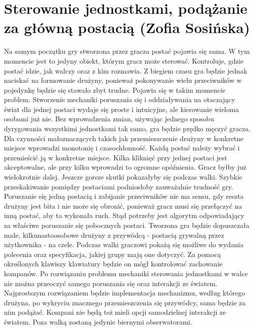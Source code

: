 \section{Sterowanie jednostkami, podążanie za główną postacią (Zofia Sosińska)}\label{chap:sjpzgp}
Na samym początku gry stworzona przez gracza postać pojawia się sama. W tym momencie jest to jedyny obiekt, którym gracz może sterować.
Kontroluje, gdzie postać idzie, jak walczy oraz z kim rozmawia. Z biegiem czasu gra będzie jednak naciskać na formowanie drużyny,
ponieważ pokonywanie wielu przeciwników w pojedynkę będzie się stawało zbyt trudne. Pojawia się w takim momencie problem.
Stworzenie mechaniki poruszania się i oddziaływania na otaczający świat dla jednej postaci wydaje się proste i intuicyjne, ale kierowanie wieloma osobami już nie. 
Bez wprowadzenia zmian, używając jednego sposobu dyrygowania wszystkimi jednostkami tak samo, gra będzie prędko męczyć gracza.
Dla czynności małoznaczących takich jak przemieszczenie drużyny w konkretne miejsce wprowadzi monotonię i czasochłonność.
Każdą postać należy wybrać i przemieścić ją w konkretne miejsce. Kilka kliknięć przy jednej postaci jest akceptowalne, ale przy kilku wprowadzi to ogromne opóźnienia.
Gracz byłby już wielokrotnie dalej. Jeszcze gorsze skutki pokazałyby się podczas walki. Szybkie przeskakiwanie pomiędzy postaciami podniosłoby zauważalnie trudność gry.
Poruszanie się jedną postacią i zabijanie przeciwników nie ma sensu, gdy reszta drużyny jest bita i nie może się obronić, ponieważ gracz musi się przełączyć na inną postać,
aby ta wykonała ruch. Stąd potrzeby jest algorytm odpowiadający za właściwe poruszanie się pobocznych postaci.
Tworzona gra będzie dopuszczała małe, kilkunastoosobowe drużyny z przywódcą - postacią grywalną przez użytkownika - na czele.
Podczas walki graczowi pokażą się możliwe do wydania polecenia oraz specyfikacja, jakiej grupy mają one dotyczyć.
Za pomocą określonych klawiszy klawiatury będzie on mógł kontrolować zachowanie kompanów.
Po rozwiązaniu problemu mechaniki sterowania jednostkami w walce nie można przeoczyć samego poruszania się oraz interakcji ze światem.
Najprostszym rozwiązaniem będzie implementacja mechanizmu, według którego drużyna, po wykryciu znacznego przemieszczenia się przywódcy, sama będzie za nim podążać.
Kompani nie będą też mieli opcji samodzielnej interakcji ze światem. Poza walką zostaną jedynie biernymi obserwatorami.

